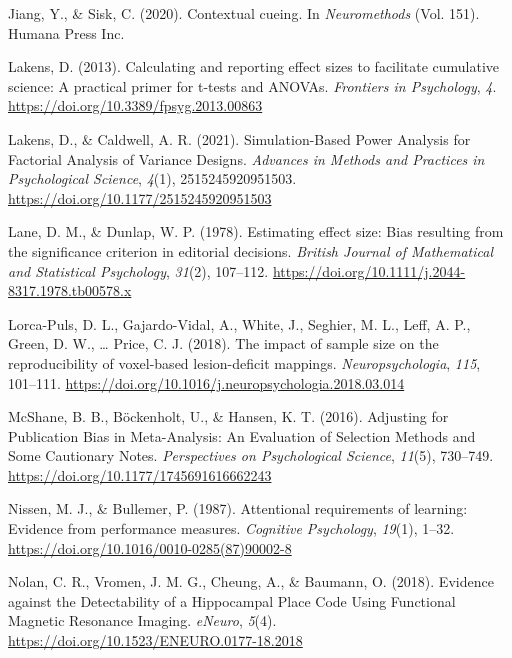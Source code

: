 \documentclass[
  man]{apa6}
\newlength{\cslhangindent}
\newlength{\cslentryspacingunit} %
\newenvironment{CSLReferences}[2] %
 {%
  \setlength{\parindent}{0pt}
  \ifodd #1
  \let\oldpar\par
  \def\par{\hangindent=\cslhangindent\oldpar}
  \fi
  \setlength{\parskip}{#2\cslentryspacingunit}
 }%
 {}
\begin{document}
\begin{CSLReferences}{1}{0}
\leavevmode{}%
Jiang, Y., \& Sisk, C. (2020). Contextual cueing. In \emph{Neuromethods} (Vol. 151). {Humana Press Inc}.

\leavevmode{}%
Lakens, D. (2013). Calculating and reporting effect sizes to facilitate cumulative science: A practical primer for t-tests and {ANOVAs}. \emph{Frontiers in Psychology}, \emph{4}. \url{https://doi.org/10.3389/fpsyg.2013.00863}

\leavevmode{}%
Lakens, D., \& Caldwell, A. R. (2021). Simulation-{Based Power Analysis} for {Factorial Analysis} of {Variance Designs}. \emph{Advances in Methods and Practices in Psychological Science}, \emph{4}(1), 2515245920951503. \url{https://doi.org/10.1177/2515245920951503}

\leavevmode{}%
Lane, D. M., \& Dunlap, W. P. (1978). Estimating effect size: {Bias} resulting from the significance criterion in editorial decisions. \emph{British Journal of Mathematical and Statistical Psychology}, \emph{31}(2), 107--112. \url{https://doi.org/10.1111/j.2044-8317.1978.tb00578.x}

\leavevmode{}%
Lorca-Puls, D. L., Gajardo-Vidal, A., White, J., Seghier, M. L., Leff, A. P., Green, D. W., \ldots{} Price, C. J. (2018). The impact of sample size on the reproducibility of voxel-based lesion-deficit mappings. \emph{Neuropsychologia}, \emph{115}, 101--111. \url{https://doi.org/10.1016/j.neuropsychologia.2018.03.014}

\leavevmode{}%
McShane, B. B., Böckenholt, U., \& Hansen, K. T. (2016). Adjusting for {Publication Bias} in {Meta-Analysis}: {An Evaluation} of {Selection Methods} and {Some Cautionary Notes}. \emph{Perspectives on Psychological Science}, \emph{11}(5), 730--749. \url{https://doi.org/10.1177/1745691616662243}

\leavevmode{}%
Nissen, M. J., \& Bullemer, P. (1987). Attentional requirements of learning: {Evidence} from performance measures. \emph{Cognitive Psychology}, \emph{19}(1), 1--32. \url{https://doi.org/10.1016/0010-0285(87)90002-8}

\leavevmode{}%
Nolan, C. R., Vromen, J. M. G., Cheung, A., \& Baumann, O. (2018). Evidence against the {Detectability} of a {Hippocampal Place Code Using Functional Magnetic Resonance Imaging}. \emph{eNeuro}, \emph{5}(4). \url{https://doi.org/10.1523/ENEURO.0177-18.2018}


\end{CSLReferences}
\end{document}
